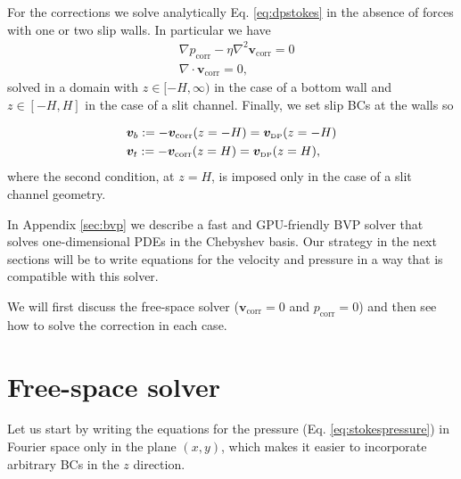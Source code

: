 \documentclass[twoside,openright,titlepage,numbers=noenddot,%
headinclude,footinclude,cleardoublepage=empty,abstract=on,
BCOR=5mm,fontsize=11pt, dvipsnames, paper=b5
]{scrreprt}
\renewcommand{\vec}[1]{\bm{#1}}
\newcommand{\gpu}{\gls{GPU}\xspace}
\newcommand{\fvel}{v}
\newcommand{\corr}{\text{corr}}
\newcommand{\dpr}{\text{\tiny DP}}
\begin{document}
For the corrections we solve analytically Eq. \eqref{eq:dpstokes} in the absence of forces with one or two slip walls. In particular we have
\begin{equation}
  \label{eq:dpstokescorr}
\begin{aligned}
    &\nabla p_{\corr} - \eta\nabla^2\vec{\fvel}_{\corr} = 0\\
    &\nabla\cdot\vec{\fvel}_{\corr} = 0,
\end{aligned}
\end{equation}
solved in a domain with $z\in [-H,\infty)$ in the case of a bottom wall and $z\in [-H, H]$ in the case of a slit channel. Finally, we set slip \glspl{BC} at the walls so

\begin{equation}
  \label{eq:dpstokescorrbcs}
  \begin{aligned}
    &\vec{\fvel}_b:=-\vec{\fvel}_{\corr}(z=-H) = \vec{\fvel}_{\dpr}(z=-H)\\
    &\vec{\fvel}_t:=-\vec{\fvel}_{\corr}(z=H) = \vec{\fvel}_{\dpr}(z=H),
\end{aligned}
\end{equation}
where the second condition, at $z=H$, is imposed only in the case of a slit channel geometry.

In Appendix \ref{sec:bvp} we describe a fast and \gpu-friendly \gls{BVP} solver that solves one-dimensional \glspl{PDE} in the Chebyshev basis. Our strategy in the next sections will be to write equations for the velocity and pressure in a way that is compatible with this solver. 

We will first discuss the free-space solver ($\vec{\fvel}_{\corr} = 0$ and $p_\corr=0$) and then see how to solve the correction in each case. 
\section{Free-space solver}
Let us start by writing the equations for the pressure (Eq. \eqref{eq:stokespressure}) in Fourier space only in the plane $(x,y)$, which makes it easier to incorporate arbitrary \glspl{BC} in the $z$ direction.
\end{document}
